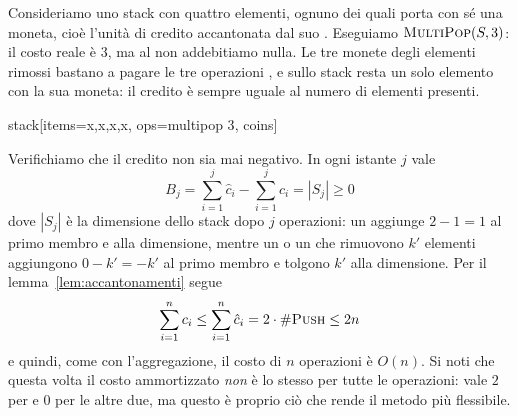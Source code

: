 \begin{esempiofig}
Consideriamo uno stack con quattro elementi, ognuno dei quali porta con sé una moneta, cioè l'unità di credito accantonata dal suo \Push. Eseguiamo $\textsc{MultiPop}(S,3)$: il costo reale è $3$, ma al \MultiPop{} non addebitiamo nulla. Le tre monete degli elementi rimossi bastano a pagare le tre operazioni \Pop, e sullo stack resta un solo elemento con la sua moneta: il credito è sempre uguale al numero di elementi presenti.
\tcblower
\begin{widget}{stack}[items={x,x,x,x}, ops={multipop 3}, coins]
\end{widget}
\end{esempiofig}

Verifichiamo che il credito non sia mai negativo. In ogni istante $j$ vale
\[
B_j = \sum_{i=1}^{j} \hat{c}_i - \sum_{i=1}^{j} c_i = |S_j| \ge 0
\]
dove $|S_j|$ è la dimensione dello stack dopo $j$ operazioni: un \Push{} aggiunge $2-1=1$ al primo membro e alla dimensione, mentre un \Pop{} o un \MultiPop{} che rimuovono $k'$ elementi aggiungono $0-k'=-k'$ al primo membro e tolgono $k'$ alla dimensione. Per il lemma~\ref{lem:accantonamenti} segue
\[
\sum_{i=1}^{n} c_i \le \sum_{i=1}^{n} \hat{c}_i = 2\cdot \#\textsc{Push} \le 2n
\]
e quindi, come con l'aggregazione, il costo di $n$ operazioni è $O(n)$. Si noti che questa volta il costo ammortizzato \emph{non} è lo stesso per tutte le operazioni: vale $2$ per \Push{} e $0$ per le altre due, ma questo è proprio ciò che rende il metodo più flessibile.

